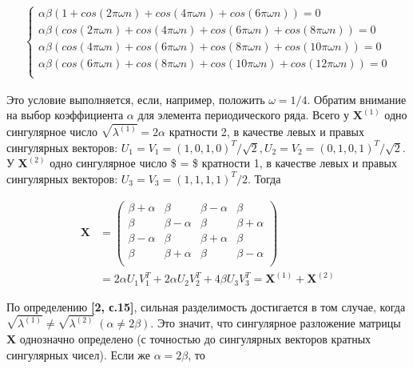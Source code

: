 \documentclass[
]{article}
\begin{document}
\begin{center}
\begin{align}
\begin{cases}
    \alpha\beta(1 + cos(2\pi \omega n) + cos(4 \pi \omega n) + cos(6\pi \omega n)) = 0 \\
    \alpha\beta(cos(2 \pi \omega n) + cos(4\pi \omega n) + cos(6 \pi \omega n) + cos(8\pi \omega n)) = 0 \\
    \alpha\beta(cos(4 \pi \omega n) + cos(6\pi \omega n) + cos(8 \pi \omega n) + cos(10\pi \omega n)) = 0 \\
    \alpha\beta(cos(6 \pi \omega n) + cos(8\pi \omega n) + cos(10 \pi \omega n) + cos(12\pi \omega n)) = 0 \\
\end{cases}
\end{align}
\end{center}

Это условие выполняется, если, например, положить \(\omega = 1/4\).
\newpage Обратим внимание на выбор коэффициента \(\alpha\) для элемента
периодического ряда. Всего у \(\textbf{X}^{(1)}\) одно сингулярное число
\(\sqrt{\lambda^{(1)}} = 2\alpha\) кратности 2, в качестве левых и
правых сингулярных векторов:
\(U_1 = V_1 = (1, 0, 1, 0)^T/\sqrt{2}, U_2 = V_2 = (0, 1, 0, 1)^T/\sqrt{2}.\)
У \(\textbf{X}^{(2)}\) одно сингулярное число \$ =
\$ кратности 1, в качестве левых и правых сингулярных векторов:
\(U_3 = V_3 = (1, 1, 1, 1)^T/2.\) Тогда

\begin{align*}
    \textbf{X} & = 
    \begin{pmatrix}
        \beta + \alpha & \beta & \beta - \alpha & \beta \\
        \beta & \beta - \alpha & \beta & \beta + \alpha \\
        \beta - \alpha & \beta & \beta + \alpha & \beta \\
        \beta & \beta + \alpha & \beta & \beta - \alpha \\
    \end{pmatrix}
     \\ & = 2\alpha U_1V_1^T + 2\alpha U_2V_2^T + 4\beta U_3V_3^T = \textbf{X}^{(1)} + \textbf{X}^{(2)}
\end{align*}

По определению \textbf{[2, с.15]}, сильная разделимость достигается в
том случае, когда
\(\sqrt{\lambda^{(1)}} \not= \sqrt{\lambda^{(2)}} \ (\alpha \not = 2\beta).\)
Это значит, что сингулярное разложение матрицы \(\textbf{X}\) однозначно
определено (с точностью до сингулярных векторов кратных сингулярных
чисел). Если же \(\alpha = 2\beta\), то
\end{document}

